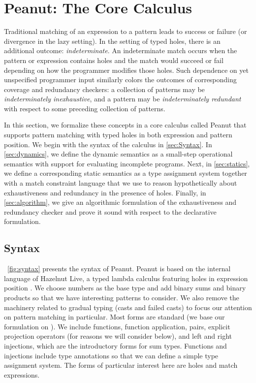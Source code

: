\section{Peanut: The Core Calculus}
Traditional matching of an expression to a pattern leads to success or failure (or divergence in the lazy setting). In the setting of typed holes, there is an additional outcome: \emph{indeterminate}.
An indeterminate match occurs when the pattern or expression contains holes and the match would succeed or fail depending on how the programmer modifies those holes. Such dependence on yet unspecified programmer input similarly colors the outcomes of corresponding coverage and redundancy checkers: a collection of patterns may be \emph{indeterminately inexhaustive}, and a pattern may be \emph{indeterminately redundant} with respect to some preceding collection of patterns.

In this section, we formalize these concepts in a core calculus called Peanut that supports pattern matching with typed holes in both expression and pattern position. 
We begin with the syntax of the calculus in \autoref{sec:Syntax}.
In \autoref{sec:dynamics}, we define the dynamic semantics as a small-step operational semantics with support for evaluating incomplete programs.
Next, in \autoref{sec:statics}, we define a corresponding static semantics as a type assignment system together with a match constraint language that we use to reason hypothetically about exhaustiveness and redundancy in the presence of
holes.
Finally, in \autoref{sec:algorithm}, we give an algorithmic formulation of the exhaustiveness and redundancy checker and prove it sound with respect to the declarative formulation.




\subsection{Syntax}
\label{sec:Syntax}
\figurename~\ref{fig:syntax} presents the syntax of Peanut.
Peanut is based on the internal language of Hazelnut Live, a typed lambda calculus featuring holes in expression position \cite{DBLP:journals/pacmpl/OmarVCH19}.
We choose numbers as the base type and add binary sums and binary products so that we have interesting
patterns to consider. We also remove the machinery related to gradual typing (casts and failed casts) to focus our attention on pattern matching in particular. Most forms are standard (we base our formulation on \cite{Harper2012}). We include functions, function application, pairs, explicit projection operators (for reasons we will consider below), and left and right injections, which are the introductory forms for sum types. Functions and injections include type annotations so that we can define a simple type assignment system. The forms of particular interest here are holes and match expressions.

